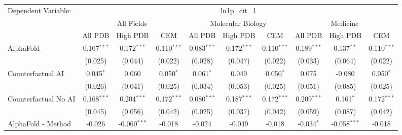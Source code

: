 \begingroup
\centering
\begin{tabular}{lccccccccc}
   \tabularnewline \midrule \midrule
   Dependent Variable: & \multicolumn{9}{c}{ln1p\_cit\_1}\\
 & \multicolumn{3}{c}{All Fields} & \multicolumn{3}{c}{Molecular Biology} & \multicolumn{3}{c}{Medicine} \\
\cmidrule(lr){2-7} \cmidrule(lr){5-10} \cmidrule(lr){8-7}
 & \multicolumn{1}{c}{All PDB} & \multicolumn{1}{c}{High PDB} & \multicolumn{1}{c}{CEM} & \multicolumn{1}{c}{All PDB} & \multicolumn{1}{c}{High PDB} & \multicolumn{1}{c}{CEM} & \multicolumn{1}{c}{All PDB} & \multicolumn{1}{c}{High PDB} & \multicolumn{1}{c}{CEM} \\
\cmidrule(lr){2-3} \cmidrule(lr){3-4} \cmidrule(lr){4-5} \cmidrule(lr){5-6} \cmidrule(lr){6-7} \cmidrule(lr){7-8} \cmidrule(lr){8-9} \cmidrule(lr){9-10} \cmidrule(lr){10-3}
   AlphaFold                                                   & 0.107$^{***}$ & 0.172$^{***}$  & 0.110$^{***}$ & 0.083$^{***}$ & 0.172$^{***}$ & 0.110$^{***}$ & 0.189$^{***}$ & 0.137$^{**}$   & 0.110$^{***}$\\   
                                                               & (0.025)       & (0.044)        & (0.022)       & (0.028)       & (0.047)       & (0.022)       & (0.033)       & (0.064)        & (0.022)\\   
   Counterfactual AI                                           & 0.045$^{*}$   & 0.060          & 0.050$^{*}$   & 0.061$^{*}$   & 0.049         & 0.050$^{*}$   & 0.075         & -0.080         & 0.050$^{*}$\\   
                                                               & (0.026)       & (0.041)        & (0.025)       & (0.034)       & (0.053)       & (0.025)       & (0.051)       & (0.085)        & (0.025)\\   
   Counterfactual No AI                                        & 0.168$^{***}$ & 0.204$^{***}$  & 0.172$^{***}$ & 0.080$^{***}$ & 0.187$^{***}$ & 0.172$^{***}$ & 0.209$^{***}$ & 0.161$^{*}$    & 0.172$^{***}$\\   
                                                               & (0.045)       & (0.056)        & (0.042)       & (0.025)       & (0.037)       & (0.042)       & (0.059)       & (0.087)        & (0.042)\\   
   AlphaFold - Method                                          & -0.026        & -0.060$^{***}$ & -0.018        & -0.024        & -0.049        & -0.018        & -0.034$^{*}$  & -0.058$^{***}$ & -0.018\\   

\end{tabular}
